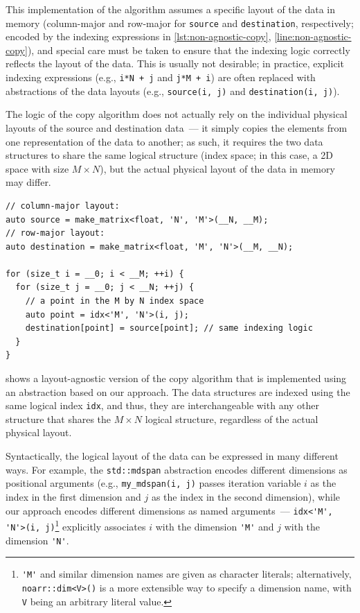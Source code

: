 This implementation of the algorithm assumes a specific layout of the data in memory (column-major and row-major for \lstinline{source} and \lstinline{destination}, respectively; encoded by the indexing expressions in \cref{lst:non-agnostic-copy}, \cref{line:non-agnostic-copy}), and special care must be taken to ensure that the indexing logic correctly reflects the layout of the data. This is usually not desirable; in practice, explicit indexing expressions (e.g., \texttt{i*N + j} and \texttt{j*M + i}) are often replaced with abstractions of the data layouts (e.g., \lstinline{source(i, j)} and \lstinline{destination(i, j)}).

The logic of the copy algorithm does not actually rely on the individual physical layouts of the source and destination data~--- it simply copies the elements from one representation of the data to another; as such, it requires the two data structures to share the same logical structure (index space; in this case, a 2D space with size $M \times N$), but the actual physical layout of the data in memory may differ.

\begin{lstlisting}[style=C++, caption={A layout-agnostic copy algorithm}, label={lst:layout-agnostic-copy}]
// column-major layout:
auto source = make_matrix<float, 'N', 'M'>(__N, __M);
// row-major layout:
auto destination = make_matrix<float, 'M', 'N'>(__M, __N);

for (size_t i = __0; i < __M; ++i) {
  for (size_t j = __0; j < __N; ++j) {
    // a point in the M by N index space
    auto point = idx<'M', 'N'>(i, j);
    destination[point] = source[point]; // same indexing logic
  }
}
\end{lstlisting}

 shows a layout-agnostic version of the copy algorithm that is implemented using an abstraction based on our approach. The data structures are indexed using the same logical index \lstinline{idx}, and thus, they are interchangeable with any other structure that shares the $M \times N$ logical structure, regardless of the actual physical layout.

Syntactically, the logical layout of the data can be expressed in many different ways. For example, the \lstinline{std::mdspan} abstraction encodes different dimensions as positional arguments (e.g., \lstinline{my_mdspan(i, j)} passes iteration variable $i$ as the index in the first dimension and $j$ as the index in the second dimension), while our approach encodes different dimensions as named arguments~--- \lstinline{idx<'M', 'N'>(i, j)}\footnote{\lstinline{'M'} and similar dimension names are given as \cpp character literals; alternatively, \lstinline{noarr::dim<V>()} is a more extensible way to specify a dimension name, with \lstinline{V} being an arbitrary literal value.} explicitly associates $i$ with the dimension \lstinline{'M'} and $j$ with the dimension \lstinline{'N'}.


